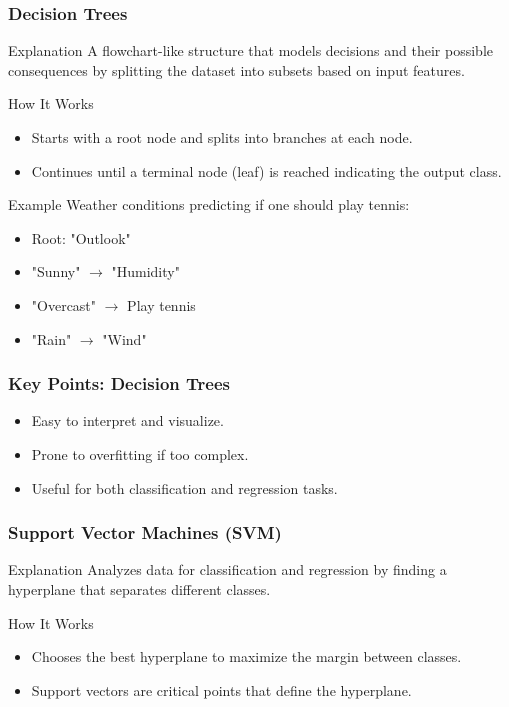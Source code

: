 \documentclass{beamer}
\begin{document}
\begin{frame}[fragile]
    \frametitle{Decision Trees}
    \begin{block}{Explanation}
        A flowchart-like structure that models decisions and their possible consequences by splitting the dataset into subsets based on input features.
    \end{block}
    
    \begin{block}{How It Works}
        \begin{itemize}
            \item Starts with a root node and splits into branches at each node.
            \item Continues until a terminal node (leaf) is reached indicating the output class.
        \end{itemize}
    \end{block}

    \begin{block}{Example}
        Weather conditions predicting if one should play tennis:
        \begin{itemize}
            \item Root: "Outlook"
            \item "Sunny" $\rightarrow$ "Humidity"
            \item "Overcast" $\rightarrow$ Play tennis
            \item "Rain" $\rightarrow$ "Wind"
        \end{itemize}
    \end{block}
\end{frame}

\begin{frame}[fragile]
    \frametitle{Key Points: Decision Trees}
    \begin{itemize}
        \item Easy to interpret and visualize.
        \item Prone to overfitting if too complex.
        \item Useful for both classification and regression tasks.
    \end{itemize}
\end{frame}

\begin{frame}[fragile]
    \frametitle{Support Vector Machines (SVM)}
    \begin{block}{Explanation}
        Analyzes data for classification and regression by finding a hyperplane that separates different classes.
    \end{block}
    
    \begin{block}{How It Works}
        \begin{itemize}
            \item Chooses the best hyperplane to maximize the margin between classes.
            \item Support vectors are critical points that define the hyperplane.
        \end{itemize}
    \end{block}
\end{frame}
\end{document}

